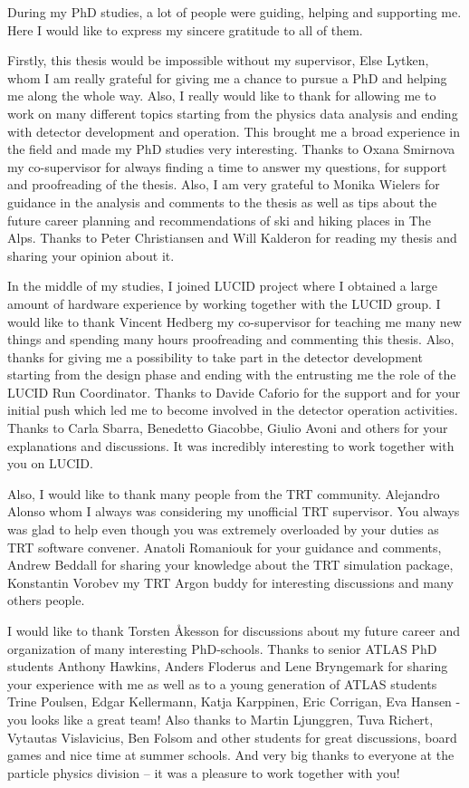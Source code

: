 \begin{acknowledgements}
  
During my PhD studies, a lot of people were guiding, helping and supporting me. Here I would like to express my sincere gratitude to all of them.

Firstly, this thesis would be impossible without my supervisor, Else Lytken, whom I am really grateful for giving me a chance to pursue a PhD and helping me along the whole way. Also, I really would like to thank for allowing me to work on many different topics starting from the physics data analysis and ending with detector development and operation. This brought me a broad experience in the field and made my PhD studies very interesting.
Thanks to Oxana Smirnova my co-supervisor for always finding a time to answer my questions, for support and proofreading of the thesis.
Also, I am very grateful to Monika Wielers for guidance in the analysis and comments to the thesis as well as tips about the future career planning and recommendations of ski and hiking places in The Alps.  
Thanks to Peter Christiansen and Will Kalderon for reading my thesis and sharing your opinion about it. 

In the middle of my studies, I joined LUCID project where I obtained a large amount of hardware experience by working together with the LUCID group.
I would like to thank Vincent Hedberg my co-supervisor for teaching me many new things and spending many hours proofreading and commenting this thesis. Also, thanks for giving me a possibility to take part in the detector development starting from the design phase and ending with the entrusting me the role of the LUCID Run Coordinator. Thanks to Davide Caforio for the support and for your initial push which led me to become involved in the detector operation activities. Thanks to Carla Sbarra, Benedetto Giacobbe, Giulio Avoni and others for your explanations and discussions. It was incredibly interesting to work together with you on LUCID.

Also, I would like to thank many people from the TRT community. Alejandro Alonso whom I always was considering my unofficial TRT supervisor. You always was glad to help even though you was extremely overloaded by your duties as TRT software convener. 
Anatoli Romaniouk for your guidance and comments,
Andrew Beddall for sharing your knowledge about the TRT simulation package, Konstantin Vorobev my TRT Argon buddy for interesting discussions and many others people. 

I would like to thank Torsten \AA{}kesson for discussions about my future career and organization of many interesting PhD-schools.
Thanks to senior ATLAS PhD students Anthony Hawkins, Anders Floderus and Lene Bryngemark for sharing your experience with me as well as to a young generation of ATLAS students Trine Poulsen, Edgar Kellermann, Katja Karppinen, Eric Corrigan, Eva Hansen - you looks like a great team!
Also thanks to Martin Ljunggren, Tuva Richert, Vytautas Vislavicius, Ben Folsom and other students for great discussions, board games and nice time at summer schools.
And very big thanks to everyone at the particle physics division -- it was a pleasure to work together with you!


\end{acknowledgements}
